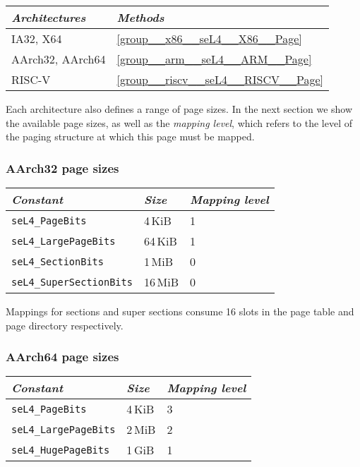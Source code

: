 \begin{tabularx}{\textwidth}{Xl} \toprule
\emph{Architectures} & \emph{Methods} \\ \midrule
IA32, X64            & \autoref{group__x86__seL4__X86__Page} \\
AArch32, AArch64     & \autoref{group__arm__seL4__ARM__Page} \\
    RISC-V           & \autoref{group__riscv__seL4__RISCV__Page} \\
\bottomrule
\end{tabularx}

Each architecture also defines a range of page sizes. In the next section we show the available page
sizes, as well as the \emph{mapping level}, which refers to
the level of the paging structure at which this page must be mapped.

\subsubsection{AArch32 page sizes}

\begin{tabularx}{\textwidth}{Xll} \toprule
    \emph{Constant}             & \emph{Size} & \emph{Mapping level} \\ \midrule
    \texttt{seL4\_PageBits}      & 4\,KiB      & 1                   \\
    \texttt{seL4\_LargePageBits} & 64\,KiB     & 1                   \\
    \texttt{seL4\_SectionBits}   & 1\,MiB      & 0                   \\
    \texttt{seL4\_SuperSectionBits} & 16\,MiB  & 0                   \\
    \bottomrule
\end{tabularx}

Mappings for sections and super sections consume 16 slots in the page table and page directory
respectively.

\subsubsection{AArch64 page sizes}

\begin{tabularx}{\textwidth}{Xll} \toprule
    \emph{Constant}             & \emph{Size} & \emph{Mapping level} \\ \midrule
    \texttt{seL4\_PageBits}      & 4\,KiB      & 3                   \\
    \texttt{seL4\_LargePageBits} & 2\,MiB     & 2                    \\
    \texttt{seL4\_HugePageBits}  & 1\,GiB     & 1                    \\
    \bottomrule
\end{tabularx}

